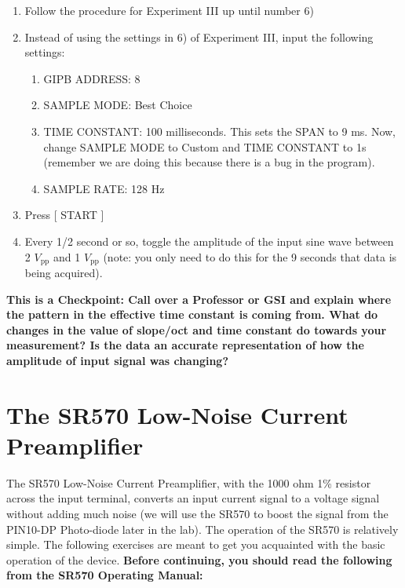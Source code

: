 \documentclass{../lab}
\begin{document}
\begin{enumerate}
    \item Follow the procedure for Experiment III up until number 6)

    \item Instead of using the settings in 6) of Experiment III, input the following settings:
    \begin{enumerate}
        \item GIPB ADDRESS: 8

        \item SAMPLE MODE: Best Choice

        \item TIME CONSTANT: 100 milliseconds. This sets the SPAN to 9 ms. Now, change SAMPLE MODE to Custom and TIME CONSTANT to 1s (remember we are doing this because there is a bug in the program).

        \item SAMPLE RATE: 128 Hz

    \end{enumerate}

    \item Press [ START ]

    \item Every 1/2 second or so, toggle the amplitude of the input sine wave between 2 $V_\text{pp}$ and 1 $V_\text{pp}$ (note: you only need to do this for the 9 seconds that data is being acquired).

\end{enumerate}

\textbf{This is a Checkpoint: Call over a Professor or GSI and explain where the pattern in the effective time constant is coming from. What do changes in the value of slope/oct and time constant do towards your measurement? Is the data an accurate representation of how the amplitude of input signal was changing?}

\section{The SR570 Low-Noise Current Preamplifier}

The SR570 Low-Noise Current Preamplifier, with the 1000 ohm 1\% resistor across the input terminal, converts an input current signal to a voltage signal without adding much noise (we will use the SR570 to boost the signal from the PIN10-DP Photo-diode later in the lab). The operation of the SR570 is relatively simple. The following exercises are meant to get you acquainted with the basic operation of the device. \textbf{Before continuing, you should read the following from the SR570 Operating Manual:}
\end{document}
